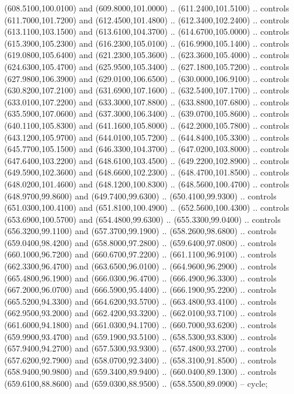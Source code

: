{\begin{scope}[y=0.80pt, x=0.80pt, yscale=-1, xscale=1, inner sep=0pt, outer sep=0pt, #1]
      (608.5100,100.0100) and (609.8000,101.0000) .. (611.2400,101.5100) .. controls
      (611.7000,101.7200) and (612.4500,101.4800) .. (612.3400,102.2400) .. controls
      (613.1100,103.1500) and (613.6100,104.3700) .. (614.6700,105.0000) .. controls
      (615.3900,105.2300) and (616.2300,105.0100) .. (616.9900,105.1400) .. controls
      (619.0800,105.6400) and (621.2300,105.3600) .. (623.3600,105.4000) .. controls
      (624.6300,105.4700) and (625.9500,105.3400) .. (627.1800,105.7200) .. controls
      (627.9800,106.3900) and (629.0100,106.6500) .. (630.0000,106.9100) .. controls
      (630.8200,107.2100) and (631.6900,107.1600) .. (632.5400,107.1700) .. controls
      (633.0100,107.2200) and (633.3000,107.8800) .. (633.8800,107.6800) .. controls
      (635.5900,107.0600) and (637.3000,106.3400) .. (639.0700,105.8600) .. controls
      (640.1100,105.8300) and (641.1600,105.8000) .. (642.2000,105.7800) .. controls
      (643.1200,105.9700) and (644.0100,105.7200) .. (644.8400,105.3300) .. controls
      (645.7700,105.1500) and (646.3300,104.3700) .. (647.0200,103.8000) .. controls
      (647.6400,103.2200) and (648.6100,103.4500) .. (649.2200,102.8900) .. controls
      (649.5900,102.3600) and (648.6600,102.2300) .. (648.4700,101.8500) .. controls
      (648.0200,101.4600) and (648.1200,100.8300) .. (648.5600,100.4700) .. controls
      (648.9700,99.8600) and (649.7400,99.6300) .. (650.4100,99.9300) .. controls
      (651.0300,100.4100) and (651.8100,100.4900) .. (652.5600,100.4300) .. controls
      (653.6900,100.5700) and (654.4800,99.6300) .. (655.3300,99.0400) .. controls
      (656.3200,99.1100) and (657.3700,99.1900) .. (658.2600,98.6800) .. controls
      (659.0400,98.4200) and (658.8000,97.2800) .. (659.6400,97.0800) .. controls
      (660.1000,96.7200) and (660.6700,97.2200) .. (661.1100,96.9100) .. controls
      (662.3300,96.4700) and (663.6500,96.0100) .. (664.9600,96.2900) .. controls
      (665.4800,96.1900) and (666.0300,96.4700) .. (666.4900,96.3300) .. controls
      (667.2000,96.0700) and (666.5900,95.4400) .. (666.1900,95.2200) .. controls
      (665.5200,94.3300) and (664.6200,93.5700) .. (663.4800,93.4100) .. controls
      (662.9500,93.2000) and (662.4200,93.3200) .. (662.0100,93.7100) .. controls
      (661.6000,94.1800) and (661.0300,94.1700) .. (660.7000,93.6200) .. controls
      (659.9900,93.4700) and (659.1900,93.5100) .. (658.5300,93.8300) .. controls
      (657.9400,94.2700) and (657.5300,93.9300) .. (657.4800,93.2700) .. controls
      (657.6200,92.7900) and (658.0700,92.3400) .. (658.3100,91.8500) .. controls
      (658.9400,90.9800) and (659.3400,89.9400) .. (660.0400,89.1300) .. controls
      (659.6100,88.8600) and (659.0300,88.9500) .. (658.5500,89.0900) -- cycle;


\end{scope}}
